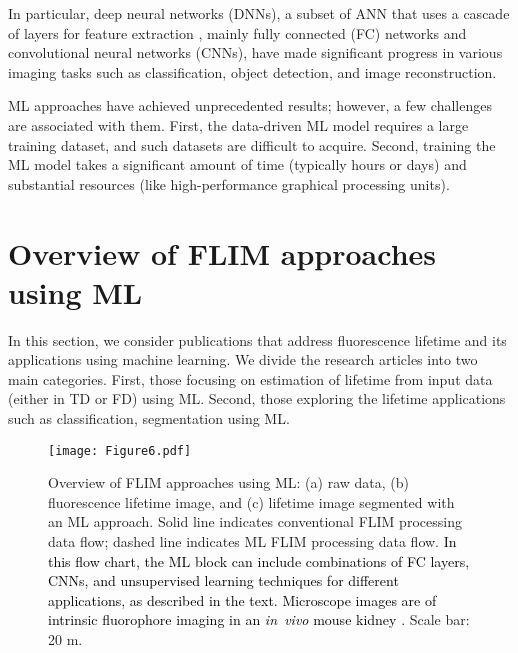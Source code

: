 \documentclass[12pt]{iopart}
\newcommand{\cc}[1]{\textcolor{black}{#1}}
\begin{document}
In particular, deep neural networks (DNNs), a subset of ANN that uses a cascade of layers for feature extraction \cite{goodfellow2016deep}, mainly fully connected (FC) networks and convolutional neural networks (CNNs), have made significant progress in various imaging tasks such as classification, object detection, and image reconstruction. 

ML approaches have achieved unprecedented results; however, a few challenges are associated with them. First, the data-driven ML model requires a large training dataset, and such datasets are difficult to acquire. Second, training the ML model takes a significant amount of time (typically hours or days) and substantial resources (like high-performance graphical processing units).

\section{Overview of FLIM approaches using ML} \label{section2}
In this section, we consider publications that address fluorescence lifetime and its applications using machine learning. We divide the research articles into two main categories. First, those focusing on estimation of lifetime from input data (either in TD or FD) using ML. Second, those exploring the lifetime applications such as classification, segmentation using ML.

\begin{figure}[!t]
\centering
\texttt{[image: Figure6.pdf]}
\caption{Overview of FLIM approaches using ML: (a) raw data, (b) fluorescence lifetime image, and (c) lifetime image segmented with an ML approach. Solid line indicates conventional FLIM processing data flow; dashed line indicates ML FLIM processing data flow. \cc{In this flow chart, the ML block can include combinations of FC layers, CNNs, and unsupervised learning techniques for different applications, as described in the text. Microscope images are of intrinsic fluorophore imaging in an \textit{in~vivo} mouse kidney \cite{phasors}.} Scale bar: 20 m.}\label{fig_main4}
\end{figure}
\end{document}
